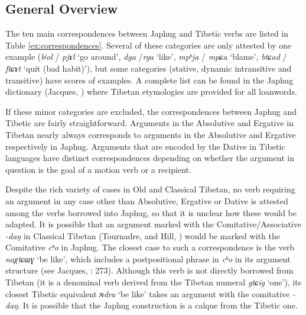 \documentclass[oneside,a4paper,11pt]{article}
\newcommand{\ipa}[1]{{\phon\textit{\mbox{#1}}}} %
\begin{document}
\subsection{General Overview}
The ten main correspondences between Japhug and Tibetic verbs are listed in Table \ref{ex:correspondences}. Several of these categories are only attested by one example (\ipa{bʲol} / \ipa{pjɤl} `go around', \ipa{dga} /\ipa{rga} `like', \ipa{mpʰja} / \ipa{mpɕa} `blame', \ipa{btɕad} / \ipa{ftɕɤt} `quit (bad habit)'), but some categories (stative, dynamic intransitive and transitive) have scores of examples. A complete list can be found in the Japhug dictionary (Jacques, \citeyear{jacques15japhug}) where Tibetan etymologies are provided for all loanwords.

If these minor categories are excluded, the correspondences between Japhug and Tibetic are fairly straightforward. Arguments in the Absolutive and Ergative in Tibetan nearly always corresponds to arguments in the Absolutive and Ergative respectively in Japhug. Arguments that are encoded by the Dative in Tibetic languages have distinct correspondences depending on whether the argument in question is the goal of a motion verb or a recipient.

Despite the rich variety of cases in Old and Classical Tibetan, no verb requiring an argument in any case other than Absolutive, Ergative or Dative is attested among the verbs borrowed into Japhug, so that it is unclear how these would be adapted. It is possible that an argument marked with the Comitative/Associative \ipa{-daŋ} in Classical Tibetan (Tournadre, \citeyear{tournadre10cases} and Hill, \citeyear{hill12bas}) would be marked with the Comitative \ipa{cʰo} in Japhug. The closest case to such a correspondence is the verb \ipa{naχtɕɯɣ} `be like', which includes a postpositional phrase in \ipa{cʰo} in its argument structure (see Jacques, \citeyear{jacques14linking}: 273). Although this verb is not directly borrowed from Tibetan (it is a denominal verb derived from the Tibetan numeral \ipa{gtɕig} `one'), its closest Tibetic equivalent \ipa{ɴdra} `be like' takes an argument with the comitative \ipa{-daŋ}. It is possible that the Japhug construction is a calque from the Tibetic one.
\end{document}
